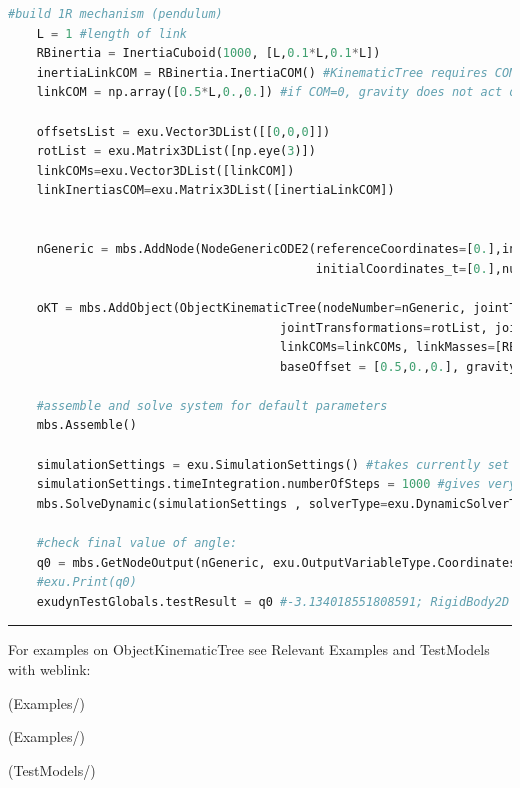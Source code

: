 \begin{lstlisting}[language=Python, firstnumber=1]
    #build 1R mechanism (pendulum)
    L = 1 #length of link
    RBinertia = InertiaCuboid(1000, [L,0.1*L,0.1*L])
    inertiaLinkCOM = RBinertia.InertiaCOM() #KinematicTree requires COM inertia
    linkCOM = np.array([0.5*L,0.,0.]) #if COM=0, gravity does not act on pendulum!

    offsetsList = exu.Vector3DList([[0,0,0]])
    rotList = exu.Matrix3DList([np.eye(3)])
    linkCOMs=exu.Vector3DList([linkCOM])
    linkInertiasCOM=exu.Matrix3DList([inertiaLinkCOM])
    
    
    nGeneric = mbs.AddNode(NodeGenericODE2(referenceCoordinates=[0.],initialCoordinates=[0.],
                                           initialCoordinates_t=[0.],numberOfODE2Coordinates=1))

    oKT = mbs.AddObject(ObjectKinematicTree(nodeNumber=nGeneric, jointTypes=[exu.JointType.RevoluteZ], linkParents=[-1],
                                      jointTransformations=rotList, jointOffsets=offsetsList, linkInertiasCOM=linkInertiasCOM,
                                      linkCOMs=linkCOMs, linkMasses=[RBinertia.mass], 
                                      baseOffset = [0.5,0.,0.], gravity=[0.,-9.81,0.]))

    #assemble and solve system for default parameters
    mbs.Assemble()
    
    simulationSettings = exu.SimulationSettings() #takes currently set values or default values
    simulationSettings.timeIntegration.numberOfSteps = 1000 #gives very accurate results
    mbs.SolveDynamic(simulationSettings , solverType=exu.DynamicSolverType.RK67) #highly accurate!

    #check final value of angle:
    q0 = mbs.GetNodeOutput(nGeneric, exu.OutputVariableType.Coordinates)
    #exu.Print(q0)
    exudynTestGlobals.testResult = q0 #-3.134018551808591; RigidBody2D with 2e6 time steps gives: -3.134018551809384
\end{lstlisting}

\vspace{6pt}\par\noindent\rule{\textwidth}{0.4pt}
%
\noindent For examples on ObjectKinematicTree see Relevant Examples and TestModels with weblink:
\bi
\item {} (Examples/)
\item {} (Examples/)
\item {} (TestModels/)

